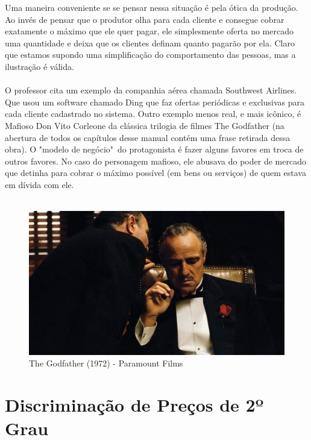\documentclass[a4paper,11pt,oneside]{book}
\theoremstyle{definition}
\theoremstyle{break}
\begin{document}
Uma maneira conveniente se se pensar nessa situação é pela ótica da produção. Ao invés de pensar que o produtor olha para cada cliente e consegue cobrar exatamente o máximo que ele quer pagar, ele simplesmente oferta no mercado uma quantidade e deixa que os clientes definam quanto pagarão por ela. Claro que estamos supondo uma simplificação do comportamento das pessoas, mas a ilustração é válida.
\\
\\
O professor cita um exemplo da companhia aérea chamada Southwest Airlines. Que usou um software chamado Ding que faz ofertas periódicas e exclusivas para cada cliente cadastrado no sistema. Outro exemplo menos real, e mais icônico, é Mafioso Don Vito Corleone da clássica trilogia de filmes The Godfather (na abertura de todos os capítulos desse manual contém uma frase retirada dessa obra). O "modelo de negócio"\ do protagonista é fazer alguns favores em troca de outros favores. No caso do personagem mafioso, ele abusava do poder de mercado que detinha para cobrar o máximo possível (em bens ou serviços) de quem estava em dívida com ele.
\\
\ 
\\
\begin{figure}[H]
\centering
\includegraphics[scale=0.5]{cap26_2-don_corleone.jpeg}
\caption*{The Godfather (1972) - Paramount Films}
\end{figure}

\section{Discriminação de Preços de 2º Grau}
\end{document}
